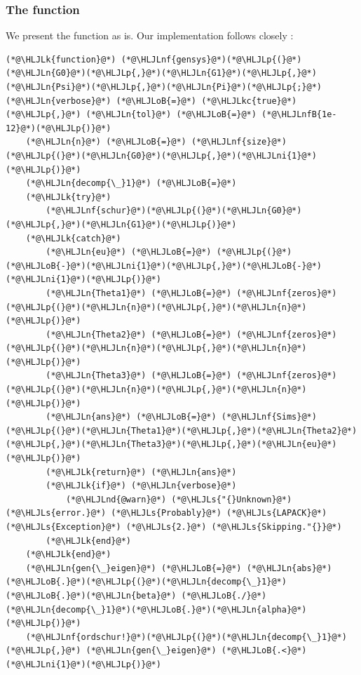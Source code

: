 \documentclass[12pt,a4paper]{article}
\newcommand{\HLJLk}[1]{\textcolor[RGB]{148,91,176}{\textbf{#1}}}
\newcommand{\HLJLkc}[1]{\textcolor[RGB]{59,151,46}{\textit{#1}}}
\newcommand{\HLJLn}[1]{#1}
\newcommand{\HLJLnd}[1]{\textcolor[RGB]{214,102,97}{#1}}
\newcommand{\HLJLnf}[1]{\textcolor[RGB]{66,102,213}{#1}}
\newcommand{\HLJLs}[1]{\textcolor[RGB]{201,61,57}{#1}}
\newcommand{\HLJLnfB}[1]{\textcolor[RGB]{59,151,46}{#1}}
\newcommand{\HLJLni}[1]{\textcolor[RGB]{59,151,46}{#1}}
\newcommand{\HLJLoB}[1]{\textcolor[RGB]{102,102,102}{\textbf{#1}}}
\newcommand{\HLJLp}[1]{#1}
\begin{document}
\subsubsection{The function}

We present the function as is. Our implementation follows closely \cite{Miao2014}:


\begin{lstlisting}
(*@\HLJLk{function}@*) (*@\HLJLnf{gensys}@*)(*@\HLJLp{(}@*)(*@\HLJLn{G0}@*)(*@\HLJLp{,}@*)(*@\HLJLn{G1}@*)(*@\HLJLp{,}@*)(*@\HLJLn{Psi}@*)(*@\HLJLp{,}@*)(*@\HLJLn{Pi}@*)(*@\HLJLp{;}@*)(*@\HLJLn{verbose}@*) (*@\HLJLoB{=}@*) (*@\HLJLkc{true}@*)(*@\HLJLp{,}@*) (*@\HLJLn{tol}@*) (*@\HLJLoB{=}@*) (*@\HLJLnfB{1e-12}@*)(*@\HLJLp{)}@*)
    (*@\HLJLn{n}@*) (*@\HLJLoB{=}@*) (*@\HLJLnf{size}@*)(*@\HLJLp{(}@*)(*@\HLJLn{G0}@*)(*@\HLJLp{,}@*)(*@\HLJLni{1}@*)(*@\HLJLp{)}@*)
    (*@\HLJLn{decomp{\_}1}@*) (*@\HLJLoB{=}@*)
    (*@\HLJLk{try}@*)
        (*@\HLJLnf{schur}@*)(*@\HLJLp{(}@*)(*@\HLJLn{G0}@*)(*@\HLJLp{,}@*)(*@\HLJLn{G1}@*)(*@\HLJLp{)}@*)
    (*@\HLJLk{catch}@*)
        (*@\HLJLn{eu}@*) (*@\HLJLoB{=}@*) (*@\HLJLp{(}@*)(*@\HLJLoB{-}@*)(*@\HLJLni{1}@*)(*@\HLJLp{,}@*)(*@\HLJLoB{-}@*)(*@\HLJLni{1}@*)(*@\HLJLp{)}@*)
        (*@\HLJLn{Theta1}@*) (*@\HLJLoB{=}@*) (*@\HLJLnf{zeros}@*)(*@\HLJLp{(}@*)(*@\HLJLn{n}@*)(*@\HLJLp{,}@*)(*@\HLJLn{n}@*)(*@\HLJLp{)}@*)
        (*@\HLJLn{Theta2}@*) (*@\HLJLoB{=}@*) (*@\HLJLnf{zeros}@*)(*@\HLJLp{(}@*)(*@\HLJLn{n}@*)(*@\HLJLp{,}@*)(*@\HLJLn{n}@*)(*@\HLJLp{)}@*)
        (*@\HLJLn{Theta3}@*) (*@\HLJLoB{=}@*) (*@\HLJLnf{zeros}@*)(*@\HLJLp{(}@*)(*@\HLJLn{n}@*)(*@\HLJLp{,}@*)(*@\HLJLn{n}@*)(*@\HLJLp{)}@*)
        (*@\HLJLn{ans}@*) (*@\HLJLoB{=}@*) (*@\HLJLnf{Sims}@*)(*@\HLJLp{(}@*)(*@\HLJLn{Theta1}@*)(*@\HLJLp{,}@*)(*@\HLJLn{Theta2}@*)(*@\HLJLp{,}@*)(*@\HLJLn{Theta3}@*)(*@\HLJLp{,}@*)(*@\HLJLn{eu}@*)(*@\HLJLp{)}@*)
        (*@\HLJLk{return}@*) (*@\HLJLn{ans}@*)
        (*@\HLJLk{if}@*) (*@\HLJLn{verbose}@*)
            (*@\HLJLnd{@warn}@*) (*@\HLJLs{"{}Unknown}@*) (*@\HLJLs{error.}@*) (*@\HLJLs{Probably}@*) (*@\HLJLs{LAPACK}@*) (*@\HLJLs{Exception}@*) (*@\HLJLs{2.}@*) (*@\HLJLs{Skipping."{}}@*)
        (*@\HLJLk{end}@*)
    (*@\HLJLk{end}@*)
    (*@\HLJLn{gen{\_}eigen}@*) (*@\HLJLoB{=}@*) (*@\HLJLn{abs}@*)(*@\HLJLoB{.}@*)(*@\HLJLp{(}@*)(*@\HLJLn{decomp{\_}1}@*)(*@\HLJLoB{.}@*)(*@\HLJLn{beta}@*) (*@\HLJLoB{./}@*) (*@\HLJLn{decomp{\_}1}@*)(*@\HLJLoB{.}@*)(*@\HLJLn{alpha}@*)(*@\HLJLp{)}@*)
    (*@\HLJLnf{ordschur!}@*)(*@\HLJLp{(}@*)(*@\HLJLn{decomp{\_}1}@*)(*@\HLJLp{,}@*) (*@\HLJLn{gen{\_}eigen}@*) (*@\HLJLoB{.<}@*) (*@\HLJLni{1}@*)(*@\HLJLp{)}@*)


\end{lstlisting}
\end{document}

